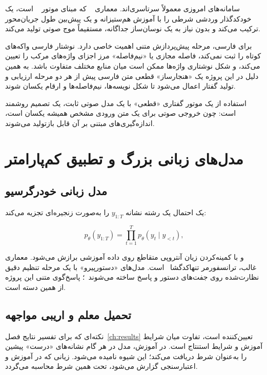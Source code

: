 سامانه‌های  امروزی معمولاً سرتاسری‌اند. معماری
~\cite{kim2021vits} که مبنای موتور ~\cite{piper2023} است، یک
خودکدگذار وردشی شرطی را با آموزش هم‌ستیزانه و یک پیش‌بین طول جریان‌محور
ترکیب می‌کند و بدون نیاز به یک نوسان‌ساز جداگانه، مستقیماً موج صوتی تولید
می‌کند.

برای فارسی، مرحله پیش‌پردازش متنی اهمیت خاصی دارد. نوشتار فارسی
واکه‌های کوتاه را ثبت نمی‌کند، فاصله مجازی یا
«نیم‌فاصله» مرز اجزای واژه‌های
مرکب را تعیین می‌کند، و شکل نوشتاری واژه‌ها ممکن است میان منابع مختلف
متفاوت باشد. به همین دلیل در این پروژه یک «هنجارساز» قطعی متن فارسی
پیش از هر دو مرحله ارزیابی و تولید گفتار اعمال می‌شود تا شکل نویسه‌ها،
نیم‌فاصله‌ها و ارقام یکسان شوند.

استفاده از یک موتور گفتاری «قطعی» با یک مدل صوتی ثابت، یک تصمیم روشمند
است: چون خروجی صوتی برای یک متن ورودی مشخص همیشه یکسان است، اندازه‌گیری‌های
مبتنی بر آن قابل بازتولید می‌شوند.

\section{مدل‌های زبانی بزرگ و تطبیق کم‌پارامتر}
\label{sec:llm}

\subsection{مدل زبانی خودرگرسیو}

یک  احتمال یک رشته نشانه $y_{1:T}$ را به‌صورت زنجیره‌ای
تجزیه می‌کند:

\begin{equation}
p_\theta(y_{1:T}) = \prod_{t=1}^{T} p_\theta(y_t \mid y_{<t}),
\label{eq:lm}
\end{equation}

و با کمینه‌کردن زیان آنتروپی متقاطع روی داده آموزشی برازش می‌شود. معماری
غالب، ترانسفورمر تنها‌کدگشا~\cite{vaswani2017attention} است. مدل‌های
«دستور‌پیرو» با یک مرحله تنظیم دقیق
نظارت‌شده روی جفت‌های دستور و پاسخ ساخته می‌شوند~\cite{ouyang2022instructgpt}؛
پاسخ‌گوی متنی این پروژه از همین دسته است.

\subsection{تحمیل معلم و اریبی مواجهه}
\label{sec:exposure-bias}

نکته‌ای که برای تفسیر نتایج فصل~\ref{ch:results} تعیین‌کننده است، تفاوت میان
شرایط آموزش و شرایط استنتاج است. در آموزش، مدل در هر گام نشانه‌های
«درست» پیشین را به‌عنوان شرط دریافت می‌کند؛ این شیوه
 نامیده می‌شود. زیانی که در آموزش و اعتبارسنجی گزارش
می‌شود، تحت همین شرط محاسبه می‌گردد.

